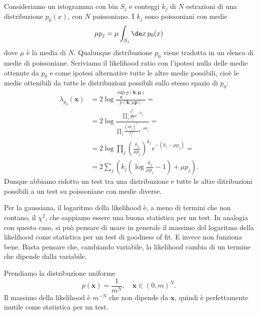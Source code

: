 
Consideriamo un istogramma con bin $S_j$ e conteggi $k_j$
di $N$ estrazioni di una distribuzione $p_0(x)$,
con $N$ poissoniano.
I $k_j$ sono poissoniani con medie
\begin{equation*}
	\mu p_j = \mu \int_{S_j} \de x\, p_0(x)
\end{equation*}
dove $\mu$ è la media di $N$.
Qualunque distribuzione $p_0$ viene tradotta in un elenco di medie di poissoniane.
Scriviamo il likelihood ratio con l'ipotesi nulla delle medie ottenute da $p_0$
e come ipotesi alternative tutte le altre medie possibili,
cioè le medie ottenibili da tutte le distribuzioni possibili sullo stesso spazio di $p_0$:
\begin{align*}
	\lambda_{p_0}(\mathbf x)
	&= 2\log \frac
	{\sup\limits_{\boldsymbol\mu} p(\mathbf k;\boldsymbol\mu)}
	{p(\mathbf k;\mu \mathbf p)} = \\
	&= 2\log \frac
	{\prod_j \frac {k_j^{k_j}} {k_j!} e^{-k_j}}
	{\prod_j \frac {(\mu p_j)^{k_j}} {k_j!} e^{-\mu p_j}} = \\
	&= 2\log \prod_j \left(\frac{k_j}{\mu p_j}\right)^{k_j} e^{-(k_j-\mu p_j)} = \\
	&= 2\sum_j \left( k_j\left(\log\frac{k_j}{\mu p_j}-1\right) + \mu p_j \right).
\end{align*}
Dunque abbiamo ridotto un test tra una distribuzione e tutte le altre ditribuzioni possibili
a un test su poissoniane con medie diverse.

Per la gaussiana,
il logaritmo della likelihood è, a meno di termini che non contano, il $\chi^2$,
che sappiamo essere una buona statistica per un test.
In analogia con questo caso,
si può pensare di usare in generale il massimo del logaritmo della likelihood
come statistica per un test di goodness of fit.
E invece non funziona bene.
Basta pensare che, cambiando variabile,
la likelihood cambia di un termine che dipende dalla variabile.

\begin{example}
	Prendiamo la distribuzione uniforme
	\begin{equation*}
		p(\mathbf x) = \frac1{m^N},
		\quad \mathbf x \in (0,m)^N.
	\end{equation*}
	Il massimo della likelihood è $m^{-N}$ che non dipende da $\mathbf x$,
	quindi è perfettamente inutile come statistica per un test.
\end{example}

